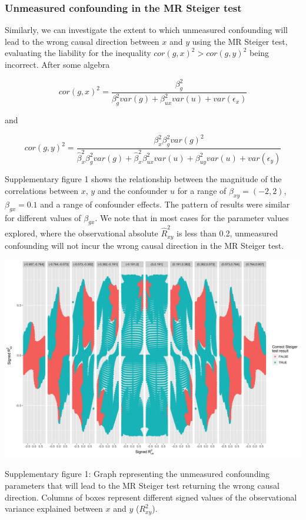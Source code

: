 \documentclass[]{article}
\begin{document}
\subsubsection{Unmeasured confounding in the MR Steiger
test}\label{unmeasured-confounding-in-the-mr-steiger-test}

Similarly, we can investigate the extent to which unmeasured confounding
will lead to the wrong causal direction between \(x\) and \(y\) using
the MR Steiger test, evaluating the liability for the inequality
\(cor(g,x)^2 > cor(g,y)^2\) being incorrect. After some algebra

\[
cor(g,x)^2 = \frac{\beta_g^2}{\beta_g^2var(g) + \beta_{ux}^2 var(u) + var(\epsilon_x)}
\]

and

\[
cor(g,y)^2 = \frac{\beta_x^2 \beta_g^2 var(g)^2} {\hat{\beta}_x^2 \beta_g^2 var(g) + \hat{\beta}_x^2 \beta_{ux}^2 var(u) + \beta_{uy}^2 var(u) + var(\epsilon_y)}
\]

Supplementary figure 1 shows the relationship between the magnitude of
the correlations between \(x\), \(y\) and the confounder \(u\) for a
range of \(\beta_{xy} = (-2,2)\), \(\beta_{gx} = 0.1\) and a range of
confounder effects. The pattern of results were similar for different
values of \(\beta_{gx}\). We note that in most cases for the parameter
values explored, where the observational absolute \(\hat{R}^2_{xy}\) is
less than 0.2, unmeasured confounding will not incur the wrong causal
direction in the MR Steiger test.

\newpage

\includegraphics{../images/unmeasured_conf_steiger.png}

Supplementary figure 1: Graph representing the unmeasured confounding
parameters that will lead to the MR Steiger test returning the wrong
causal direction. Columns of boxes represent different signed values of
the observational variance explained between \(x\) and \(y\)
(\(R^2_{xy}\)).
\end{document}
